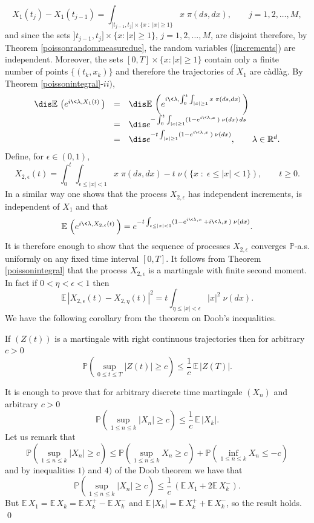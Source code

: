 \documentclass[preprint]{imsart}
\def\P{\mathbb P}
\def\E{\mathbb E}
\def\R{\mathbb R}
\begin{document}
{\begin{equation}\label{increments}
X_1(t_j)-X_1(t_{j-1})=
 \int_{]t_{j-1},t_j]\times \{x\; :\; |x|\geq 1\}}x\; \pi(ds,dx),
\qquad j=1,2,\ldots ,M,
\end{equation}
and since the sets $]t_{j-1},t_j]\times \{x:|x|\geq 1\}$,
$ j=1,2,\ldots ,M$, are disjoint therefore, by Theorem
\ref{poissonrandommeasuredue}, the random variables (\ref{increments}) are
independent. Moreover, the sets $[0,T]\times\{x:|x|\geq 1\}$
contain only a finite number of points $\{(t_k,x_k)\}$ and
therefore the trajectories of $X_1$ are c\`adl\`ag. By Theorem
\ref{poissonintegral}-$ii)$,
$$\begin{array}{lll}\dis
  \E\, \left(e^{i\<\lambda,X_1(t)\>}\right) & = & \dis
 \E\, \left(e^{i\<\lambda, \int_0^t \int_{|x|\geq 1}x\; \pi(ds,dx)\>}
 \right)   \\
    & = & \dis
e^{-  \int_0^t \int_{|x|\geq 1}(1-e^{i\<\lambda,x\>})\; \nu(dx)\,ds}
     \\
    & = & \dis
    e^{-t \int_{|x|\geq 1}(1-e^{i\<\lambda,x\>})\; \nu(dx)},\qquad
    \lambda\in\R^d.
\end{array}
$$
Define, for $\epsilon\in (0,1)$,
$$
X_{2,\epsilon}(t)=
\int_0^t \int_{\epsilon\leq |x|< 1}x\; \pi(ds,dx)-
t \; \nu(\{x\;:\; \epsilon\leq |x|< 1\}),
\qquad  t\ge 0.
$$
In a similar way one shows that the process $X_{2,\epsilon}$ has
independent increments, is independent of $X_1$ and that
$$
 \E\, \left(e^{i\<\lambda,X_{2,\epsilon}(t)\>}\right)  =
  e^{-t \int_{\epsilon \le |x|< 1}(1-e^{i\<\lambda,x\>}
  +i\<\lambda,x\>)\; \nu(dx)}.
  $$
It is therefore enough  to show that the sequence of processes
$X_{2,\epsilon}$ converges  $\P$-a.s.
 uniformly on any fixed time interval $[0,T]$.
It follows from Theorem \ref{poissonintegral} that
the process $X_{2,\epsilon}$ is a martingale with finite
second moment. In fact if $0<\eta<\epsilon <1$ then
$$
\E\, |X_{2,\epsilon}(t)- X_{2,\eta}(t)|^2=
t \int_{\eta\leq |x|<\epsilon}|x|^2\; \nu(dx).
$$
We have the following corollary from the theorem on Doob's
inequalities.

\begin{Lemma}
  If $(Z(t))$ is a martingale with right continuous trajectories
  then for arbitrary $c>0$
  $$
  \P\left(\sup_{0\le t\le T}|Z(t)|\ge c\right)
  \le \frac{1}{c}\, \E\, |Z(T)|.
  $$
\end{Lemma}

 It is enough to prove that for arbitrary
discrete time martingale $(X_n)$ and arbitrary  $c>0$
 $$
  \P\left(\sup_{1\le n\le k}|X_n|\ge c\right)
  \le \frac{1}{c}\, \E\, |X_k|.
  $$
Let us remark that
 $$
  \P\left(\sup_{1\le n\le k}|X_n|\ge c\right)
  \le \P\left(\sup_{1\le n\le k}X_n\ge c\right)
  + \P\left(\inf_{1\le n\le k}X_n\le -c\right)
  $$
  and by inequalities $1)$ and $4)$ of the Doob theorem we have
  that
 $$
  \P\left(\sup_{1\le n\le k}|X_n|\ge c\right)
  \le \frac{1}{c}\, (\E \, X_1+2\E\, X_k^-).
  $$
But $\E\, X_1=\E\, X_k = \E\, X_k^+-\E\, X_k^-$ and
$\E\,|X_k|= \E\, X_k^+ +\E\, X_k^-$, so the result holds.
\qed

}
\end{document}
